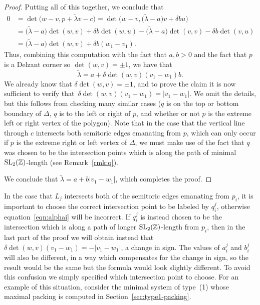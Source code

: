 \documentclass[pdftex]{sigma}
\numberwithin{equation}{section}
\def\Z{{\mathbb Z}}
\newcommand{\De}{\Delta}
\newcommand{\SL}{{\rm SL}_2(\Z)}
\begin{document}
\begin{proof}
Putting all of this together, we conclude that
\begin{align*}
 0 & = \det \big(w - v, p+\widetilde{\lambda}v-c\big) = \det \big(w-v, \big(\widetilde{\lambda} - a\big)v + \delta bu\big)\\
 & = \big(\widetilde{\lambda} - a\big)\det (w,v) + \delta b \det (w, u) - \big(\widetilde{\lambda}-a\big) \det (v, v) - \delta b \det (v, u)\\
 & = \big(\widetilde{\lambda} - a\big) \det (w,v) + \delta b(w_1 - v_1).
\end{align*}
Thus, combining this computation with the fact that $a,b>0$ and the fact that $p$ is a Delzant corner so $\det(w,v)=\pm 1$, we have that
\[
 \widetilde{\lambda} = a + \delta \det(w,v) (v_1-w_1)b.
\]
We already know that $\delta \det(w,v) = \pm 1$, and to prove the claim it is now sufficient to verify that~$\delta \det(w,v) (v_1-w_1) = |v_1-w_1|$.
We omit the details, but this follows from checking many similar cases ($q$ is on the top or bottom boundary of $\De$, $q$ is to the left or right of $p$, and whether or not $p$ is the extreme left or right vertex of the polygon). Note that in the case that the vertical line through $c$ intersects both semitoric edges emanating from $p$, which can only occur if $p$ is the extreme right or left vertex of $\De$, we must make use of the fact that $q$ was chosen to be the intersection points which is along the path of minimal $\SL$-length (see Remark~\ref{rmk:q}).

We conclude that $\widetilde{\lambda} = a + b|v_1-w_1|$, which completes the proof.
\end{proof}

\begin{Remark}\label{rmk:q}
In the case that $L_j$ intersects both of the semitoric edges emanating from $p_i$, it is important to choose the correct intersection point to be labeled by $q_i^j$, otherwise equation~\eqref{eqn:alphai} will be incorrect.
If $q_i^j$ is instead chosen to be the intersection which is along a path of longer $\SL$-length from $p_i$, then
in the last part of the proof we will obtain instead that $\delta \det(w,v) (v_1-w_1) = -|v_1-w_1|$, a change in sign.
The values of $a_i^j$ and $b_i^j$ will also be different, in a way which compensates for the change in sign, so the result would be the same but the formula would look slightly different. To avoid this confusion we simply specified which intersection point to choose.
For an example of this situation, consider
the minimal system of type~(1) whose maximal packing is computed in Section~\ref{sec:type1-packing}.
\end{Remark}
\end{document}
